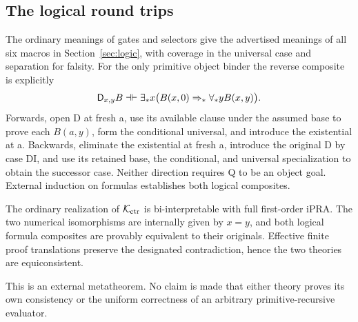 \subsection{The logical round trips}

The ordinary meanings of gates and selectors give the advertised
meanings of all six macros in Section~\ref{sec:logic}, with coverage
in the universal case and separation for falsity. For the only primitive
object binder the reverse composite is explicitly
\[
 \mathsf D_{x,y}B\dashv\vdash
 \exists_*x\bigl(B(x,0)\Rightarrow_*\forall_*yB(x,y)\bigr).
\]
Forwards, open D at fresh a, use its available clause under the assumed
base to prove each $B(a,y)$, form the conditional universal, and introduce
the existential at a. Backwards, eliminate the existential at fresh a,
introduce the original D by case DI, and use its retained base, the
conditional, and universal specialization to obtain the successor case.
Neither direction requires Q to be an object goal. External induction
on formulas establishes both logical composites.

\begin{theorem}
The ordinary realization of $\mathcal K_{\mathrm{ctr}}$ is bi-interpretable with full
first-order iPRA. The two numerical isomorphisms are internally given
by $x=y$, and both logical formula composites are provably equivalent
to their originals. Effective finite proof translations preserve the
designated contradiction, hence the two theories are equiconsistent.
\end{theorem}
This is an external metatheorem. No claim is made that either theory
proves its own consistency or the uniform correctness of an arbitrary
primitive-recursive evaluator.

